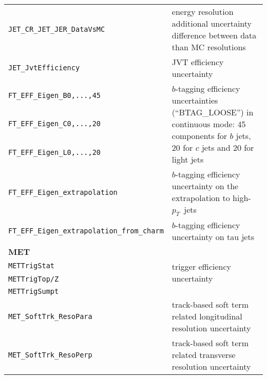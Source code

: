 \begin{table}
{\begin{tabular}{ll}
      \texttt{JET\_CR\_JET\_JER\_DataVsMC} & energy resolution additional uncertainty difference between data than MC resolutions \\%
      \texttt{JET\_JvtEfficiency} & JVT efficiency uncertainty \\%
      \texttt{FT\_EFF\_Eigen\_B0,...,45} & \multirow{3}{*}{\parbox{11cm}{$b$-tagging efficiency uncertainties (``BTAG\_LOOSE'') in continuous mode: 45 components for $b$ jets, 20 for $c$ jets and 20 for light jets}} \\%
      \texttt{FT\_EFF\_Eigen\_C0,...,20} &\\%
      \texttt{FT\_EFF\_Eigen\_L0,...,20} &\\%
      \texttt{FT\_EFF\_Eigen\_extrapolation} & $b$-tagging efficiency uncertainty on the extrapolation to high-$p_T$\ jets \\%
      \texttt{FT\_EFF\_Eigen\_extrapolation\_from\_charm} & $b$-tagging efficiency uncertainty on tau jets \\%
      {\bfseries MET}&\\
      \texttt{METTrigStat}  &  \multirow{2}{*}{trigger efficiency uncertainty} \\%
      \texttt{METTrigTop/Z} & \\%
      \texttt{METTrigSumpt} & \\%
      \texttt{MET\_SoftTrk\_ResoPara} & track-based soft term related longitudinal resolution uncertainty \\%
      \texttt{MET\_SoftTrk\_ResoPerp} &  track-based soft term related transverse resolution uncertainty \\%

\end{tabular}}
\end{table}
